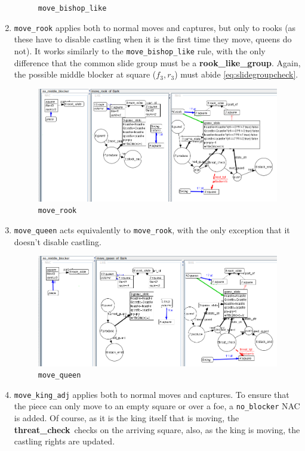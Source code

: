 \documentclass[a4paper, 10pt]{scrartcl}
\newcommand{\noderepr}[1]{\textsf{\textbf{#1}}}
\newcommand{\rookgroupnode}{\noderepr{rook\_like\_group}}
\newcommand{\threatcheck}{\noderepr{threat\_check}}
\begin{document}
\begin{enumerate}
\begin{figure}[H]
            \caption{\texttt{move\_bishop\_like}}
        \end{figure}
        \item \texttt{move\_rook} applies both to normal moves and captures, but only to rooks (as these have to disable castling when it is the first time they move, queens do not). It works similarly to the \texttt{move\_bishop\_like} rule, with the only difference that the common slide group must be a \rookgroupnode. Again, the possible middle blocker at square ($f_3, r_3$) must abide \ref{eq:slidegroupcheck}.
        \begin{figure}[H]
            \centering
            \includegraphics[width=.8\linewidth]{images/move_rook.png}
            \caption{\texttt{move\_rook}}
        \end{figure}
        \item \texttt{move\_queen} acts equivalently to \texttt{move\_rook}, with the only exception that it doesn't disable castling.
        \begin{figure}[H]
            \centering
            \includegraphics[width=.8\linewidth]{images/move_queen.png}
            \caption{\texttt{move\_queen}}
        \end{figure}
        \item \texttt{move\_king\_adj} applies both to normal moves and captures. To ensure that the piece can only move to an empty square or over a foe, a \texttt{no\_blocker} NAC is added. Of course, as it is the king itself that is moving, the \threatcheck\ checks on the arriving square, also, as the king is moving, the castling rights are updated.

\end{enumerate}
\end{document}
